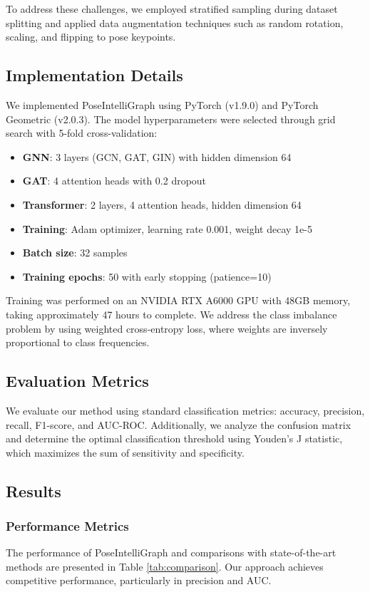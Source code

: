 \documentclass[conference]{IEEEtran}
\begin{document}
To address these challenges, we employed stratified sampling during dataset
splitting and applied data augmentation techniques such as random rotation,
scaling, and flipping to pose keypoints.

\subsection{Implementation Details}
We implemented PoseIntelliGraph using PyTorch (v1.9.0) and PyTorch Geometric
(v2.0.3). The model hyperparameters were selected through grid search with
5-fold cross-validation:

\begin{itemize}
    \item \textbf{GNN}: 3 layers (GCN, GAT, GIN) with hidden dimension 64
    \item \textbf{GAT}: 4 attention heads with 0.2 dropout
    \item \textbf{Transformer}: 2 layers, 4 attention heads, hidden dimension 64
    \item \textbf{Training}: Adam optimizer, learning rate 0.001, weight decay 1e-5
    \item \textbf{Batch size}: 32 samples
    \item \textbf{Training epochs}: 50 with early stopping (patience=10)
\end{itemize}

Training was performed on an NVIDIA RTX A6000 GPU with 48GB memory, taking
approximately 47 hours to complete. We address the class imbalance problem by
using weighted cross-entropy loss, where weights are inversely proportional to
class frequencies.

\subsection{Evaluation Metrics}
We evaluate our method using standard classification metrics: accuracy,
precision, recall, F1-score, and AUC-ROC. Additionally, we analyze the
confusion matrix and determine the optimal classification threshold using
Youden's J statistic, which maximizes the sum of sensitivity and specificity.

\subsection{Results}

\subsubsection{Performance Metrics}
The performance of PoseIntelliGraph and comparisons with state-of-the-art
methods are presented in Table \ref{tab:comparison}. Our approach achieves
competitive performance, particularly in precision and AUC.
\end{document}
